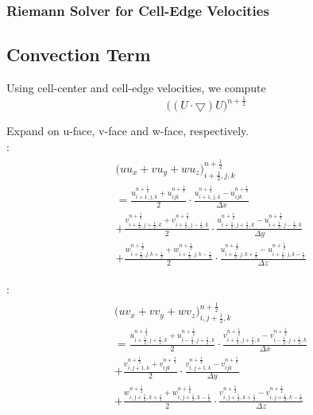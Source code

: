 \documentclass{article}
\numberwithin{equation}{subsection}
\begin{document}
\subsubsection{Riemann Solver for Cell-Edge Velocities}




\subsection{Convection Term}
Using cell-center and cell-edge velocities, we compute
\begin{equation}
\Big((U \cdot \bigtriangledown )U \Big)^{n+\frac{1}{2}}
\end{equation}


Expand on u-face, v-face and w-face, respectively. \\
:
\begin{align}
\begin{split}
& \Big(uu_x + vu_y + wu_z \Big)^{n+\frac{1}{2}}_{i+\frac{1}{2},j,k} \\
& = \frac{u^{n+\frac{1}{2}}_{i+1,j,k} + u^{n+\frac{1}{2}}_{ijk}}{2} \cdot \frac{u^{n+\frac{1}{2}}_{i+1,j,k}-u^{n+\frac{1}{2}}_{ijk}}{\Delta x}\\
&+ \frac{v^{n+\frac{1}{2}}_{i+\frac{1}{2},j+\frac{1}{2},k} + v^{n+\frac{1}{2}}_{i+\frac{1}{2},j-\frac{1}{2},k}}{2} \cdot \frac{u^{n+\frac{1}{2}}_{i+\frac{1}{2},j+\frac{1}{2},k} - u^{n+\frac{1}{2}}_{i+\frac{1}{2},j-\frac{1}{2},k}}{\Delta y}\\
& + \frac{w^{n+\frac{1}{2}}_{i+\frac{1}{2},j,k+\frac{1}{2}} + w^{n+\frac{1}{2}}_{i+\frac{1}{2},j,k-\frac{1}{2}}}{2} \cdot \frac{u^{n+\frac{1}{2}}_{i+\frac{1}{2},j,k+\frac{1}{2}}-u^{n+\frac{1}{2}}_{i+\frac{1}{2},j,k-\frac{1}{2}}}{\Delta z}
\end{split}
\end{align}

:
\begin{align}
\begin{split}
& \Big( uv_x + vv_y + wv_z \Big)^{n+\frac{1}{2}}_{i,j+\frac{1}{2},k} \\
& = \frac{u^{n+\frac{1}{2}}_{i+\frac{1}{2},j+\frac{1}{2},k} + u^{n+\frac{1}{2}}_{i-\frac{1}{2},j+\frac{1}{2},k}}{2} \cdot \frac{v^{n+\frac{1}{2}}_{i+\frac{1}{2},j+\frac{1}{2},k} - v^{n+\frac{1}{2}}_{i-\frac{1}{2},j+\frac{1}{2},k}}{\Delta x}\\
& + \frac{v^{n+\frac{1}{2}}_{i,j+1,k} + v^{n+\frac{1}{2}}_{ijk}}{2} \cdot \frac{v^{n+\frac{1}{2}}_{i,j+1,k} - v^{n+\frac{1}{2}}_{ijk}}{\Delta y}\\
& + \frac{w^{n+\frac{1}{2}}_{i,j+\frac{1}{2},k+\frac{1}{2}} + w^{n+\frac{1}{2}}_{i,j+\frac{1}{2},k-\frac{1}{2}}}{2} \cdot \frac{v^{n+\frac{1}{2}}_{i,j+\frac{1}{2},k+\frac{1}{2}} - v^{n+\frac{1}{2}}_{i,j+\frac{1}{2},k-\frac{1}{2}}}{\Delta z}
\end{split}
\end{align}
\end{document}
